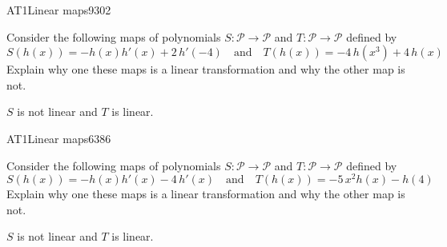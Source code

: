 \begin{exercise}{AT1}{Linear maps}{9302} 
\begin{exerciseStatement} 

 Consider the following maps of polynomials \(S:\mathcal{P}\rightarrow\mathcal{P}\) and \(T:\mathcal{P}\rightarrow\mathcal{P}\) defined by \[
            S(h(x))=
                    -h\left(x\right) h'\left(x\right) + 2 \, h'\left(-4\right)
                \hspace{1em} \text{and} \hspace{1em}
            T(h(x))=
                    -4 \, h\left(x^{3}\right) + 4 \, h\left(x\right)
        \] Explain why one these maps is a linear transformation and why the other map is not. 

 \end{exerciseStatement}
 \begin{exerciseAnswer} 

\(S\) is not linear and \(T\) is linear.

 \end{exerciseAnswer}
 \end{exercise}


\begin{exercise}{AT1}{Linear maps}{6386} 
\begin{exerciseStatement} 

 Consider the following maps of polynomials \(S:\mathcal{P}\rightarrow\mathcal{P}\) and \(T:\mathcal{P}\rightarrow\mathcal{P}\) defined by \[
            S(h(x))=
                    -h\left(x\right) h'\left(x\right) - 4 \, h'\left(x\right)
                \hspace{1em} \text{and} \hspace{1em}
            T(h(x))=
                    -5 \, x^{2} h\left(x\right) - h\left(4\right)
        \] Explain why one these maps is a linear transformation and why the other map is not. 

 \end{exerciseStatement}
 \begin{exerciseAnswer} 

\(S\) is not linear and \(T\) is linear.

 \end{exerciseAnswer}
 \end{exercise}


